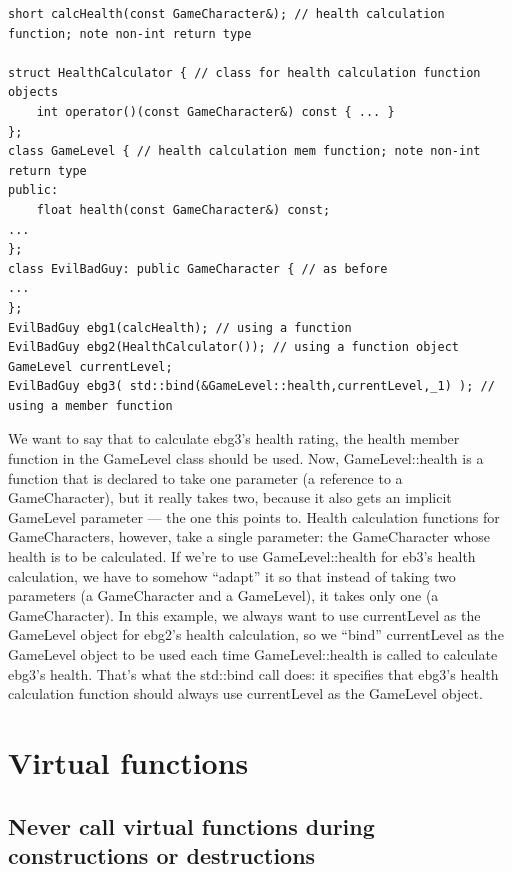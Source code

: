 \documentclass[a4paper,12pt,notitlepage]{article}
\begin{document}
\begin{verbatim}
short calcHealth(const GameCharacter&); // health calculation function; note non-int return type

struct HealthCalculator { // class for health calculation function objects
    int operator()(const GameCharacter&) const { ... }
};
class GameLevel { // health calculation mem function; note non-int return type
public:
    float health(const GameCharacter&) const;
...
};
class EvilBadGuy: public GameCharacter { // as before
...
};
EvilBadGuy ebg1(calcHealth); // using a function
EvilBadGuy ebg2(HealthCalculator()); // using a function object
GameLevel currentLevel;
EvilBadGuy ebg3( std::bind(&GameLevel::health,currentLevel,_1) ); // using a member function 
\end{verbatim}

We want to say that to calculate ebg3's health rating, the health member function in the GameLevel class should be used. Now, GameLevel::health is a function that is declared to take one parameter (a reference to a GameCharacter), but it really takes two, because it also gets an implicit GameLevel parameter — the one this points to. Health calculation functions for GameCharacters, however, take a single parameter: the GameCharacter whose health is to be calculated. If we're to use GameLevel::health for eb3's health calculation, we have to somehow “adapt” it so that instead of taking two parameters (a GameCharacter and a GameLevel), it takes only one (a GameCharacter). In this example, we always want to use currentLevel as the GameLevel object for ebg2's health calculation, so we “bind” currentLevel as the GameLevel object to be used each time GameLevel::health is called to calculate ebg3's health. That's what the std::bind call does: it specifies that ebg3's health calculation function should always use currentLevel as the GameLevel object.


\section{Virtual functions}


\subsection{Never call virtual functions during constructions or destructions}
\end{document}
